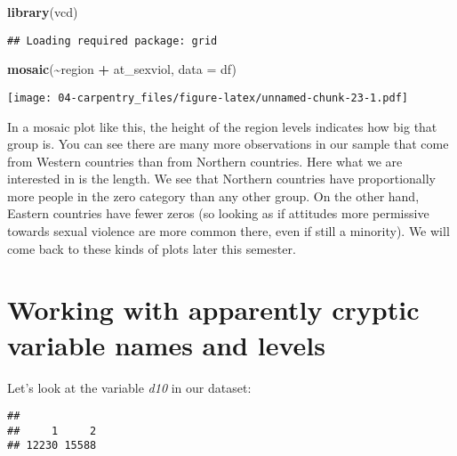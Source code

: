 \documentclass[
]{book}
\newenvironment{Shaded}{\begin{snugshade}}{\end{snugshade}}
\newcommand{\AttributeTok}[1]{\textcolor[rgb]{0.13,0.29,0.53}{#1}}
\newcommand{\FunctionTok}[1]{\textcolor[rgb]{0.13,0.29,0.53}{\textbf{#1}}}
\newcommand{\NormalTok}[1]{#1}
\newcommand{\SpecialCharTok}[1]{\textcolor[rgb]{0.81,0.36,0.00}{\textbf{#1}}}
\begin{document}
\begin{Shaded}
\begin{Highlighting}[]
\FunctionTok{library}\NormalTok{(vcd)}
\end{Highlighting}
\end{Shaded}

\begin{verbatim}
## Loading required package: grid
\end{verbatim}

\begin{Shaded}
\begin{Highlighting}[]
\FunctionTok{mosaic}\NormalTok{(}\SpecialCharTok{\textasciitilde{}}\NormalTok{region }\SpecialCharTok{+}\NormalTok{ at\_sexviol, }\AttributeTok{data =}\NormalTok{ df)}
\end{Highlighting}
\end{Shaded}

\texttt{[image: 04-carpentry\_files/figure-latex/unnamed-chunk-23-1.pdf]}

In a mosaic plot like this, the height of the region levels indicates how big that group is. You can see there are many more observations in our sample that come from Western countries than from Northern countries. Here what we are interested in is the length. We see that Northern countries have proportionally more people in the zero category than any other group. On the other hand, Eastern countries have fewer zeros (so looking as if attitudes more permissive towards sexual violence are more common there, even if still a minority). We will come back to these kinds of plots later this semester.

\section{Working with apparently cryptic variable names and levels}\label{working-with-apparently-cryptic-variable-names-and-levels}

Let's look at the variable \emph{d10} in our dataset:

\begin{Shaded}
\end{Shaded}

\begin{verbatim}
## 
##     1     2 
## 12230 15588
\end{verbatim}
\end{document}

